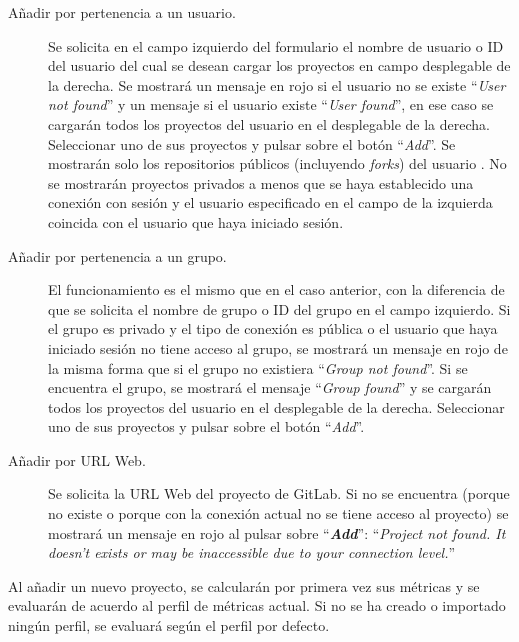 \begin{description}
	\item[Añadir por pertenencia a un usuario.] Se solicita en el campo izquierdo del formulario el nombre de usuario o ID del usuario del cual se desean cargar los proyectos en campo desplegable de la derecha. Se mostrará un mensaje en rojo si el usuario no se existe ``\textit{User not found}'' y un mensaje si el usuario existe ``\textit{User found}'', en ese caso se cargarán todos los proyectos del usuario en el desplegable de la derecha. Seleccionar uno de sus proyectos y pulsar sobre el botón ``\textit{Add}''. Se mostrarán solo los repositorios públicos (incluyendo \textit{forks}) del usuario . No se mostrarán proyectos privados a menos que se haya establecido una conexión con sesión y el usuario especificado en el campo de la izquierda coincida con el usuario que haya iniciado sesión.
	\item[Añadir por pertenencia a un grupo.] El funcionamiento es el mismo que en el caso anterior, con la diferencia de que se solicita el nombre de grupo o ID del grupo en el campo izquierdo. Si el grupo es privado y el tipo de conexión es pública o el usuario que haya iniciado sesión no tiene acceso al grupo, se mostrará un mensaje en rojo de la misma forma que si el grupo no existiera ``\textit{Group not found}''. Si se encuentra el grupo, se mostrará el mensaje ``\textit{Group found}'' y se cargarán todos los proyectos del usuario en el desplegable de la derecha. Seleccionar uno de sus proyectos y pulsar sobre el botón ``\textit{Add}''.
	\item[Añadir por URL Web.] Se solicita la URL Web del proyecto de GitLab. Si no se encuentra (porque no existe o porque con la conexión actual no se tiene acceso al proyecto) se mostrará un mensaje en rojo al pulsar sobre ``\textbf{\textit{Add}}'': ``\textit{Project not found. It doesn't exists or may be inaccessible due to your connection level.}''
\end{description}
Al añadir un nuevo proyecto, se calcularán por primera vez sus métricas y se evaluarán de acuerdo al perfil de métricas actual. Si no se ha creado o importado ningún perfil, se evaluará según el perfil por defecto.
